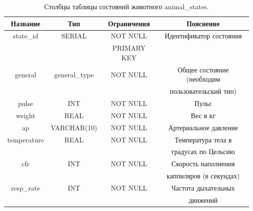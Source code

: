 \documentclass[a4paper,14pt]{article}
\begin{document}
\begin{table}[!h]
	\caption{Столбцы таблицы состояний животного animal\_states.}
	\begin{center}
		\begin{tabular}{| c | c | c | c |}
	 	\hline
		Название & Тип & Ограничения & Пояснение \\ \hline
		state\_id & SERIAL & NOT NULL & Идентификатор состояния \\
		 &  & PRIMARY KEY &  \\ \hline
		general & general\_type & NOT NULL & Общее состояние (необходим \\
		 &  &  & пользовательский тип) \\ \hline
		pulse & INT & NOT NULL & Пульс \\ \hline
		weight & REAL & NOT NULL & Вес в кг \\ \hline
		ap & VARCHAR(10) & NOT NULL & Артериальное давление \\ \hline
		temperature & REAL & NOT NULL & Температура тела в  \\
		 &  &  & градусах по Цельсию  \\ \hline
		cfr & INT & NOT NULL & Скорость наполнения \\
		 &  &  & каппиляров (в секундах) \\ \hline
		resp\_rate & INT & NOT NULL & Частота дыхательных \\
		 &  &  & движений \\ \hline
	\end{tabular}
	\end{center}
\end{table}
\end{document}
